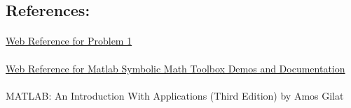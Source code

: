 \documentclass[]{article}
\begin{document}
\subsection{References:}
\paragraph{}
\href{http://en.wikipedia.org/wiki/Root_mean_square}{Web Reference for Problem 1}
\paragraph{}
\href{http://www.mathworks.com/help/toolbox/symbolic/}{Web Reference for Matlab Symbolic Math Toolbox Demos and Documentation}
\paragraph{}
MATLAB: An Introduction With Applications (Third Edition) by Amos Gilat


\end{document}
